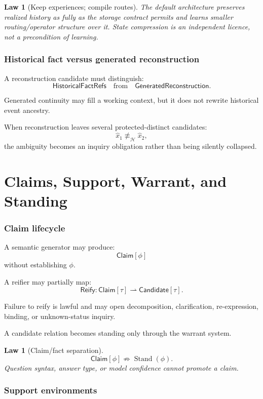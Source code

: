 \documentclass[11pt,oneside]{article}
\newtheorem{law}[definition]{Law}
\newcommand{\Stand}{\operatorname{Stand}}
\begin{document}
\begin{law}[Keep experiences; compile routes]
The default architecture preserves realized history as fully as the storage contract permits and learns smaller routing/operator structure over it.  State compression is an independent licence, not a precondition of learning.
\end{law}

\section{Historical fact versus generated reconstruction}

A reconstruction candidate must distinguish:
\[
\boxed{
\mathsf{HistoricalFactRefs}
\quad\text{from}\quad
\mathsf{GeneratedReconstruction}.
}
\]

Generated continuity may fill a working context, but it does not rewrite historical event ancestry.

When reconstruction leaves several protected-distinct candidates:
\[
\widehat x_1\not\equiv_{\mathcal H}\widehat x_2,
\]
the ambiguity becomes an inquiry obligation rather than being silently collapsed.

\part{Claims, Support, Warrant, and Standing}

\section{Claim lifecycle}

A semantic generator may produce:
\[
\boxed{
\mathsf{Claim}[\phi]
}
\]
without establishing \(\phi\).

A reifier may partially map:
\[
\mathsf{Reify}:
\mathsf{Claim}[\tau]
\rightharpoonup
\mathsf{Candidate}[\tau].
\]

Failure to reify is lawful and may open decomposition, clarification, re-expression, binding, or unknown-status inquiry.

A candidate relation becomes standing only through the warrant system.

\begin{law}[Claim/fact separation]
\[
\boxed{
\mathsf{Claim}[\phi]
\not\Rightarrow
\Stand(\phi).
}
\]
Question syntax, answer type, or model confidence cannot promote a claim.
\end{law}

\section{Support environments}
\end{document}
